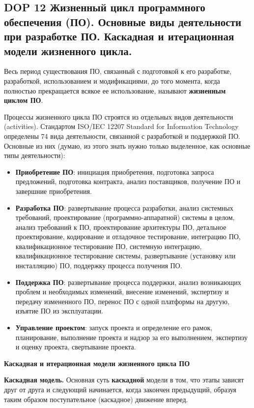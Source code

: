 \subsection{DOP 12 Жизненный  цикл  программного  обеспечения  (ПО).  Основные  виды  деятельности  при  разработке  ПО. Каскадная и итерационная модели жизненного цикла.}

Весь период существования ПО, связанный с подготовкой к его разработке, разработкой, использованием и модификациями, до того момента, когда полностью прекращается всякое ее использование, называют \textbf{жизненным циклом ПО}.

Процессы жизненного цикла ПО строятся из отдельных видов деятельности (activities).
Стандартом ISO/IEC 12207 Standard for Information Technology определены 74 вида деятельности, связанной с разработкой и поддержкой ПО.
Основные из них (думаю, из этого знать нужно только выделенное, как основные типы деятельности):
\begin{itemize}
    \item \textbf{Приобретение ПО}: инициация приобретения, подготовка запроса предложений, подготовка контракта, анализ поставщиков, получение ПО и завершние приобретения.
    \item \textbf{Разработка ПО}: развертывание процесса разработки, анализ системных требований, проектирование (программно-аппаратной) системы в целом, анализ требований к ПО, проектирование архитектуры ПО, детальное проектирование, кодирование и отладочное тестирование, интеграцию ПО, квалификационное тестирование ПО, системную интеграцию, квалификационное тестирование системы, развертывание (установку или инсталляцию) ПО, поддержку процесса получения ПО.
    \item \textbf{Поддержка ПО}: развертывание процесса поддержки, анализ возникающих проблем и необходимых изменений, внесение изменений, экспертизу и передачу измененного ПО, перенос ПО с одной платформы на другую, изъятие ПО из эксплуатации.
    \item \textbf{Управление проектом}: запуск проекта и определение его рамок, планирование, выполнение проекта и надзор за его выполнением, экспертизу и оценку проекта, свертывание проекта.
\end{itemize}

\textbf{Каскадная и итерационная модели жизненного цикла ПО}

\textbf{Каскадная модель.} Основная суть \textbf{каскадной} модели в том, что этапы зависят друг от друга и следующий начинается, когда закончен предыдущий, образуя таким образом поступательное (каскадное) движение вперед. 

